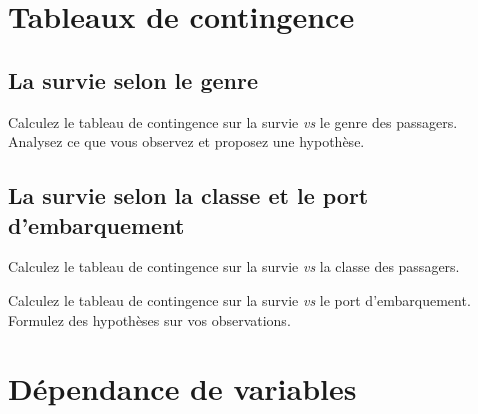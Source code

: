 \documentclass[11pt]{exam}
\begin{document}
\section{Tableaux de contingence}

\subsection{La survie selon le genre}
\begin{questions}
  \question Calculez le tableau de contingence sur la survie \emph{vs}
  le genre des passagers. 
  \question Analysez ce que vous observez et proposez une hypothèse.
\end{questions}

\subsection{La survie selon la classe et le port d'embarquement}
\begin{questions}
  \question Calculez le tableau de contingence sur la survie \emph{vs}
  la classe des passagers.

  \question Calculez le tableau de contingence sur la survie \emph{vs}
  le port d'embarquement.
  \question Formulez des hypothèses sur vos observations.
\end{questions}

\section{Dépendance de variables}
\end{document}
